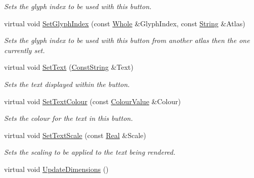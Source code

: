 \begin{DoxyCompactItemize}
\begin{DoxyCompactList}\small\item\em Sets the glyph index to be used with this button. \item\end{DoxyCompactList}\item 
virtual void \hyperlink{classMezzanine_1_1UI_1_1TextButton_a472deffab04ac63c4938cc928d24f11e}{SetGlyphIndex} (const \hyperlink{namespaceMezzanine_adcbb6ce6d1eb4379d109e51171e2e493}{Whole} \&GlyphIndex, const \hyperlink{namespaceMezzanine_acf9fcc130e6ebf08e3d8491aebcf1c86}{String} \&Atlas)
\begin{DoxyCompactList}\small\item\em Sets the glyph index to be used with this button from another atlas then the one currently set. \item\end{DoxyCompactList}\item 
virtual void \hyperlink{classMezzanine_1_1UI_1_1TextButton_a8e3d1d82b3e50cacd6189361eb7ea058}{SetText} (\hyperlink{namespaceMezzanine_a63cd699ac54b73953f35ec9cfc05e506}{ConstString} \&Text)
\begin{DoxyCompactList}\small\item\em Sets the text displayed within the button. \item\end{DoxyCompactList}\item 
virtual void \hyperlink{classMezzanine_1_1UI_1_1TextButton_a1f6f0e3a5246989aa67fafaeb45e6bdc}{SetTextColour} (const \hyperlink{classMezzanine_1_1ColourValue}{ColourValue} \&Colour)
\begin{DoxyCompactList}\small\item\em Sets the colour for the text in this button. \item\end{DoxyCompactList}\item 
virtual void \hyperlink{classMezzanine_1_1UI_1_1TextButton_ad9265dea19c5e84e2dd29bc40e4d8351}{SetTextScale} (const \hyperlink{namespaceMezzanine_a726731b1a7df72bf3583e4a97282c6f6}{Real} \&Scale)
\begin{DoxyCompactList}\small\item\em Sets the scaling to be applied to the text being rendered. \item\end{DoxyCompactList}\item 
virtual void \hyperlink{classMezzanine_1_1UI_1_1TextButton_a06a5a6400dff268de5c91737de09fda9}{UpdateDimensions} ()

\end{DoxyCompactItemize}
